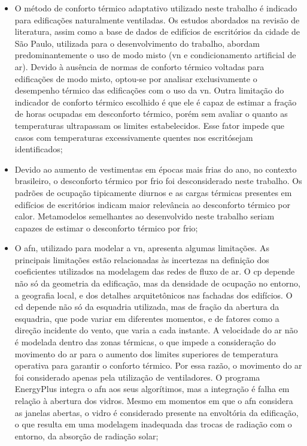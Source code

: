 \documentclass[brazil,hardcopy,openany]{ufscthesis} %
\begin{document}
\begin{itemize}
	\item O método de conforto térmico adaptativo utilizado neste trabalho é indicado para edificações naturalmente ventiladas. Os estudos abordados na revisão de literatura, assim como a base de dados de edifícios de escritórios da cidade de São Paulo, utilizada para o desenvolvimento do trabalho, abordam predominantemente o uso de modo misto (\acrshort{vn} e condicionamento artificial de ar). Devido à ausência de normas de conforto térmico voltadas para edificações de modo misto, optou-se por analisar exclusivamente o desempenho térmico das edificações com o uso da \acrshort{vn}.
	Outra limitação do indicador de conforto térmico escolhido é que ele é capaz de estimar a fração de horas ocupadas em desconforto térmico, porém sem avaliar o quanto as temperaturas ultrapassam os limites estabelecidos.
	Esse fator impede que casos com temperaturas excessivamente quentes nos escritósejam identificados;
	
	\item Devido ao aumento de vestimentas em épocas mais frias do ano, no contexto brasileiro, o desconforto térmico por frio foi desconsiderado neste trabalho. Os padrões de ocupação tipicamente diurnos e as cargas térmicas presentes em edifícios de escritórios indicam maior relevância ao desconforto térmico por calor. Metamodelos semelhantes ao desenvolvido neste trabalho seriam capazes de estimar o desconforto térmico por frio;
	
	\item O \acrlong{afn}, utilizado para modelar a \acrshort{vn}, apresenta algumas limitações. 
	As principais limitações estão relacionadas às incertezas na definição dos coeficientes utilizados na modelagem das redes de fluxo de ar. 
	O \acrshort{cp} depende não só da geometria da edificação, mas da densidade de ocupação no entorno, a geografia local, e dos detalhes arquitetônicos nas fachadas dos edifícios.
	O \acrfull{cd} depende não só da esquadria utilizada, mas de fração da abertura da esquadria, que pode variar em diferentes momentos, e de fatores como a direção incidente do vento, que varia a cada instante.
	A velocidade do ar não é modelada dentro das zonas térmicas, o que impede a consideração do movimento do ar para o aumento dos limites superiores de temperatura operativa para garantir o conforto térmico. 
	Por essa razão, o movimento do ar foi considerado apenas pela utilização de ventiladores.
	O programa EnergyPlus integra o \acrshort{afn} aos seus algorítimos, mas a integração é falha em relação à abertura dos vidros. Mesmo em momentos em que o \acrshort{afn} considera as janelas abertas, o vidro é considerado presente na envoltória da edificação, o que resulta em uma modelagem inadequada das trocas de radiação com o entorno, da absorção de radiação solar;
	

\end{itemize}
\end{document}
